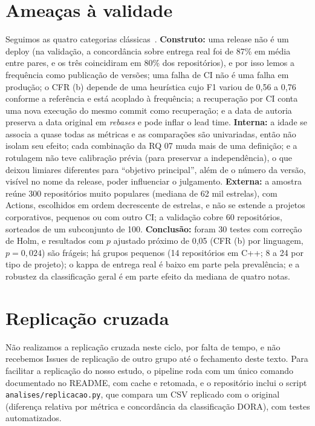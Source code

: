 \documentclass[12pt]{article}
\begin{document}
\section{Ameaças à validade}
\label{sec:ameacas}

Seguimos as quatro categorias clássicas~\cite{wohlin2012}. \textbf{Construto:} uma release não é um deploy (na validação, a concordância sobre entrega real foi de 87\% em média entre pares, e os três coincidiram em 80\% dos repositórios), e por isso lemos a frequência como publicação de versões; uma falha de CI não é uma falha em produção; o CFR (b) depende de uma heurística cujo F1 variou de 0,56 a 0,76 conforme a referência e está acoplado à frequência; a recuperação por CI conta uma nova execução do mesmo commit como recuperação; e a data de autoria preserva a data original em \emph{rebases} e pode inflar o lead time. \textbf{Interna:} a idade se associa a quase todas as métricas e as comparações são univariadas, então não isolam seu efeito; cada combinação da RQ 07 muda mais de uma definição; e a rotulagem não teve calibração prévia (para preservar a independência), o que deixou limiares diferentes para ``objetivo principal'', além de o número da versão, visível no nome da release, poder influenciar o julgamento. \textbf{Externa:} a amostra reúne 300 repositórios muito populares (mediana de 62 mil estrelas), com Actions, escolhidos em ordem decrescente de estrelas, e não se estende a projetos corporativos, pequenos ou com outro CI; a validação cobre 60 repositórios, sorteados de um subconjunto de 100. \textbf{Conclusão:} foram 30 testes com correção de Holm, e resultados com $p$ ajustado próximo de 0,05 (CFR (b) por linguagem, $p=0{,}024$) são frágeis; há grupos pequenos (14 repositórios em C++; 8 a 24 por tipo de projeto); o kappa de entrega real é baixo em parte pela prevalência; e a robustez da classificação geral é em parte efeito da mediana de quatro notas.

\section{Replicação cruzada}
\label{sec:replicacao}

Não realizamos a replicação cruzada neste ciclo, por falta de tempo, e não recebemos Issues de replicação de outro grupo até o fechamento deste texto. Para facilitar a replicação do nosso estudo, o pipeline roda com um único comando documentado no README, com cache e retomada, e o repositório inclui o script \texttt{analises/replicacao.py}, que compara um CSV replicado com o original (diferença relativa por métrica e concordância da classificação DORA), com testes automatizados.
\end{document}
